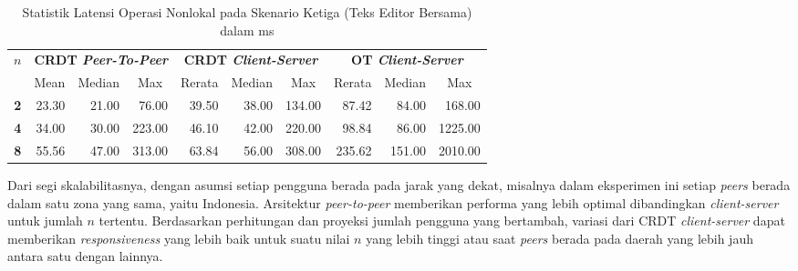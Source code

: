 \begin{table}[H]
 \centering
\begin{tabular}{|c|rrr|rrr|rrr|}
\hline
\multirow{2}{*}{$n$} & \multicolumn{3}{c|}{\textbf{CRDT \textit{Peer-To-Peer}}} & \multicolumn{3}{c|}{\textbf{CRDT \textit{Client-Server}}} & \multicolumn{3}{c|}{\textbf{OT \textit{Client-Server}}} \\ \cline{2-10}
 & \multicolumn{1}{c|}{Mean} & \multicolumn{1}{c|}{Median} & \multicolumn{1}{c|}{Max} & \multicolumn{1}{c|}{Rerata} & \multicolumn{1}{c|}{Median} & \multicolumn{1}{c|}{Max} & \multicolumn{1}{c|}{Rerata} & \multicolumn{1}{c|}{Median} & \multicolumn{1}{c|}{Max} \\ \hline
\textbf{2} & \multicolumn{1}{r|}{23.30} & \multicolumn{1}{r|}{21.00} & 76.00 & \multicolumn{1}{r|}{39.50} & \multicolumn{1}{r|}{38.00} & 134.00 & \multicolumn{1}{r|}{87.42} & \multicolumn{1}{r|}{84.00} & 168.00 \\ \hline
\textbf{4} & \multicolumn{1}{r|}{34.00} & \multicolumn{1}{r|}{30.00} & 223.00 & \multicolumn{1}{r|}{46.10} & \multicolumn{1}{r|}{42.00} & 220.00 & \multicolumn{1}{r|}{98.84} & \multicolumn{1}{r|}{86.00} & 1225.00 \\ \hline
\textbf{8} & \multicolumn{1}{r|}{55.56} & \multicolumn{1}{r|}{47.00} & 313.00 & \multicolumn{1}{r|}{63.84} & \multicolumn{1}{r|}{56.00} & 308.00 & \multicolumn{1}{r|}{235.62} & \multicolumn{1}{r|}{151.00} & 2010.00 \\ \hline
\end{tabular}
 \caption{Statistik Latensi Operasi Nonlokal pada Skenario Ketiga (Teks Editor Bersama) dalam ms}
 \label{tab:latency-3}
\end{table}

Dari segi skalabilitasnya, dengan asumsi setiap pengguna berada pada jarak yang dekat, misalnya dalam eksperimen ini setiap \textit{peers} berada dalam satu zona yang sama, yaitu Indonesia. Arsitektur \textit{peer-to-peer} memberikan performa yang lebih optimal dibandingkan \textit{client-server} untuk jumlah $n$ tertentu. Berdasarkan perhitungan dan proyeksi jumlah pengguna yang bertambah, variasi dari CRDT \textit{client-server} dapat memberikan \textit{responsiveness} yang lebih baik untuk suatu nilai $n$ yang lebih tinggi atau saat \textit{peers} berada pada daerah yang lebih jauh antara satu dengan lainnya.

